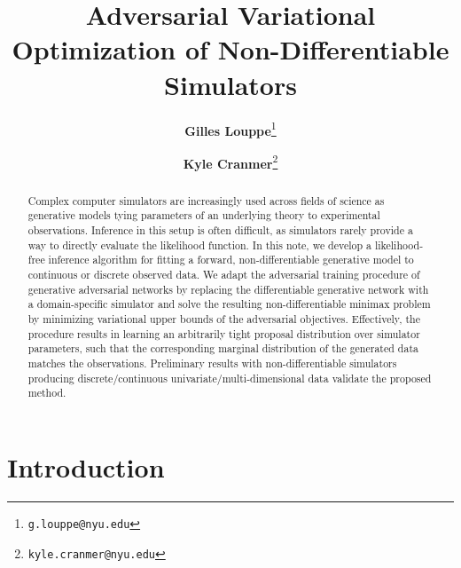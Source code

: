 \documentclass[twocolumn,superscriptaddress,aps]{revtex4-1}
\theoremstyle{plain}
\begin{document}

\title{\Large{Adversarial Variational Optimization of Non-Differentiable Simulators}}
\vspace{1cm}
\author{\small{\bf Gilles Louppe}\thanks{\texttt{g.louppe@nyu.edu}}}
\author{\small{\bf Kyle Cranmer}\thanks{\texttt{kyle.cranmer@nyu.edu}}}

\begin{abstract}

Complex computer simulators are increasingly used across fields of science as
generative models tying parameters of an underlying theory to
experimental observations. Inference in this setup is often
difficult, as simulators rarely provide a way to directly evaluate the likelihood
function. In this note, we develop a likelihood-free
inference algorithm for fitting a forward, non-differentiable generative model to
continuous or discrete observed data. We adapt the adversarial training procedure of generative
adversarial networks by replacing the differentiable generative network with a
domain-specific simulator and solve the resulting non-differentiable
minimax problem by minimizing variational upper bounds of the adversarial objectives.
Effectively, the procedure results in learning an arbitrarily tight
proposal distribution over simulator parameters, such that the corresponding
marginal distribution of the generated data matches the observations.
Preliminary results with non-differentiable simulators producing discrete/continuous univariate/multi-dimensional data
validate the proposed method.


\end{abstract}

\maketitle


\section{Introduction}
\end{document}
